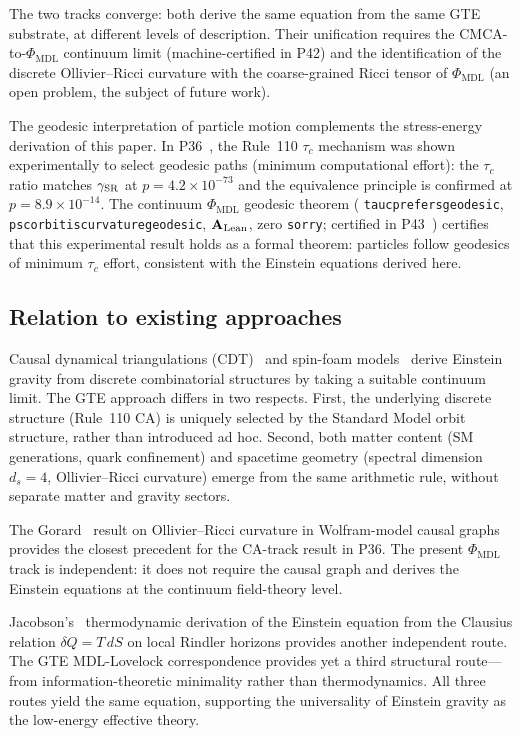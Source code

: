 \documentclass[11pt]{article}
\theoremstyle{remark}
\newcommand{\PHIMDL}{\Phi_{\mathrm{MDL}}}
\newcommand{\lean}[1]{%
  \penalty-100
  \begingroup\def\_{\textunderscore\allowbreak}\texttt{#1}\endgroup}
\newcommand{\CatAL}{\ensuremath{\textbf{A}_{\rm Lean}}}
\begin{document}
The two tracks converge: both derive the same equation from the same GTE substrate,
at different levels of description.
Their unification requires the CMCA-to-$\PHIMDL$ continuum limit (machine-certified in P42)
and the identification of the discrete Ollivier--Ricci curvature with the coarse-grained
Ricci tensor of $\PHIMDL$ (an open problem, the subject of future work).

The geodesic interpretation of particle motion complements the stress-energy
derivation of this paper.  In P36~\cite{SpivackEmergentGravity}, the Rule~110
$\tau_c$ mechanism was shown experimentally to select geodesic paths (minimum
computational effort): the $\tau_c$ ratio matches $\gamma_{\rm SR}$ at
$p = 4.2\times10^{-73}$ and the equivalence principle is confirmed at
$p = 8.9\times10^{-14}$.  The continuum $\PHIMDL$ geodesic theorem
(\lean{tau\_c\_prefers\_geodesic}, \lean{psc\_orbit\_is\_curvature\_geodesic},
$\CatAL$, zero \texttt{sorry}; certified in P43~\cite{SpivackCompleteness})
certifies that this experimental result holds as a formal theorem: particles
follow geodesics of minimum $\tau_c$ effort, consistent with the Einstein
equations derived here.

\subsection{Relation to existing approaches}

Causal dynamical triangulations (CDT)~\cite{Ambjorn2012} and
spin-foam models~\cite{Perez2013} derive Einstein gravity from discrete combinatorial
structures by taking a suitable continuum limit.
The GTE approach differs in two respects.
First, the underlying discrete structure (Rule~110 CA) is uniquely selected
by the Standard Model orbit structure, rather than introduced ad hoc.
Second, both matter content (SM generations, quark confinement) and spacetime geometry
(spectral dimension $d_s=4$, Ollivier--Ricci curvature) emerge from the same
arithmetic rule, without separate matter and gravity sectors.

The Gorard~\cite{Gorard2020Rel} result on Ollivier--Ricci curvature in Wolfram-model
causal graphs provides the closest precedent for the CA-track result in P36.
The present $\PHIMDL$ track is independent: it does not require the causal graph
and derives the Einstein equations at the continuum field-theory level.

Jacobson's~\cite{Jacobson1995} thermodynamic derivation of the Einstein equation from
the Clausius relation $\delta Q = T\,dS$ on local Rindler horizons provides another
independent route.
The GTE MDL-Lovelock correspondence provides yet a third structural route---from
information-theoretic minimality rather than thermodynamics.
All three routes yield the same equation, supporting the universality of Einstein gravity
as the low-energy effective theory.
\end{document}
